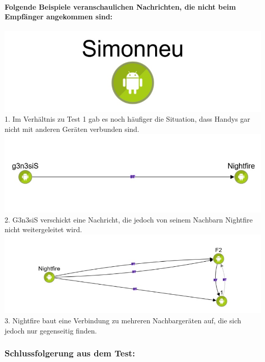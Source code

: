\paragraph*{Folgende Beispiele veranschaulichen Nachrichten, die nicht beim
Empfänger angekommen sind:}
\includegraphics[width=1.0\textwidth]{belege/grosstests/Bilder/Grosstest2/Test2Misserfolg1.jpg}\\
1. Im Verhältnis zu Test 1 gab es noch häufiger die Situation, dass Handys
gar nicht mit anderen Geräten verbunden sind.\\
\includegraphics[width=1.0\textwidth]{belege/grosstests/Bilder/Grosstest2/Test2Misserfolg2.jpg}\\
2. G3n3siS verschickt eine Nachricht, die jedoch von seinem Nachbarn
Nightfire nicht weitergeleitet wird.\\
\includegraphics[width=1.0\textwidth]{belege/grosstests/Bilder/Grosstest2/Test2Misserfolg3.jpg}\\
3. Nightfire baut eine Verbindung zu mehreren Nachbargeräten auf, die sich
jedoch nur gegenseitig finden.\\

\subsubsection{Schlussfolgerung aus dem
Test:}\label{schlussfolgerung-aus-dem-test-3}

